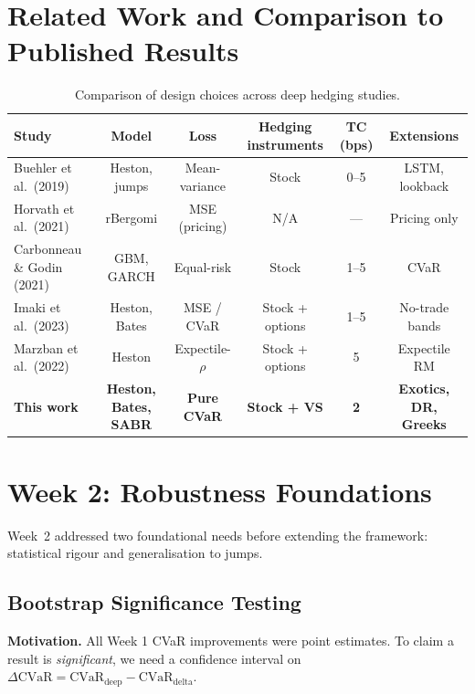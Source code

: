 \documentclass[11pt, a4paper]{article}
\begin{document}
\section{Related Work and Comparison to Published Results}
\label{sec:related}

\begin{table}[H]
\centering
\footnotesize
\caption{Comparison of design choices across deep hedging studies.}
\label{tab:lit}
\begin{tabular}{lccccc}
\toprule
Study & Model & Loss & Hedging instruments & TC (bps) & Extensions \\
\midrule
Buehler et al.\ (2019) & Heston, jumps & Mean-variance & Stock & 0--5 & LSTM, lookback \\
Horvath et al.\ (2021) & rBergomi & MSE (pricing) & N/A & --- & Pricing only \\
Carbonneau \& Godin (2021) & GBM, GARCH & Equal-risk & Stock & 1--5 & CVaR \\
Imaki et al.\ (2023) & Heston, Bates & MSE / CVaR & Stock + options & 1--5 & No-trade bands \\
Marzban et al.\ (2022) & Heston & Expectile-$\rho$ & Stock + options & 5 & Expectile RM \\
\midrule
\textbf{This work} & \textbf{Heston, Bates, SABR} & \textbf{Pure CVaR} & \textbf{Stock + VS} & \textbf{2} & \textbf{Exotics, DR, Greeks} \\
\bottomrule
\end{tabular}
\end{table}


\section{Week 2: Robustness Foundations}
\label{sec:week2}

Week~2 addressed two foundational needs before extending the framework:
statistical rigour and generalisation to jumps.

\subsection{Bootstrap Significance Testing}

\textbf{Motivation.} All Week 1 CVaR improvements were point estimates.
To claim a result is \emph{significant}, we need a confidence interval on
$\Delta\mathrm{CVaR} = \mathrm{CVaR}_{\text{deep}} - \mathrm{CVaR}_{\text{delta}}$.
\end{document}
